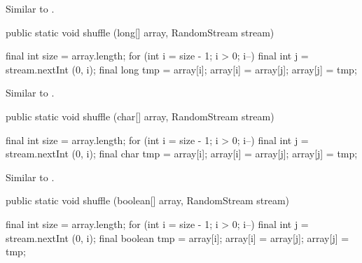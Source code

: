 \begin{tabb} Similar to .
\end{tabb}
\begin{htmlonly}
\end{htmlonly}
\begin{code}

   public static void shuffle (long[] array, RandomStream stream)\begin{hide} {
      final int size = array.length;
      for (int i = size - 1; i > 0; i--) {
         final int j = stream.nextInt (0, i);
         final long tmp = array[i];
         array[i] = array[j];
         array[j] = tmp;
      }
   }\end{hide}
\end{code}
\begin{tabb} Similar to .
\end{tabb}
\begin{htmlonly}
\end{htmlonly}
\begin{code}

   public static void shuffle (char[] array, RandomStream stream)\begin{hide} {
      final int size = array.length;
      for (int i = size - 1; i > 0; i--) {
         final int j = stream.nextInt (0, i);
         final char tmp = array[i];
         array[i] = array[j];
         array[j] = tmp;
      }
   }\end{hide}
\end{code}
\begin{tabb} Similar to .
\end{tabb}
\begin{htmlonly}
\end{htmlonly}
\begin{code}

   public static void shuffle (boolean[] array, RandomStream stream)\begin{hide} {
      final int size = array.length;
      for (int i = size - 1; i > 0; i--) {
         final int j = stream.nextInt (0, i);
         final boolean tmp = array[i];
         array[i] = array[j];
         array[j] = tmp;
      }
   }\end{hide}
\end{code}
